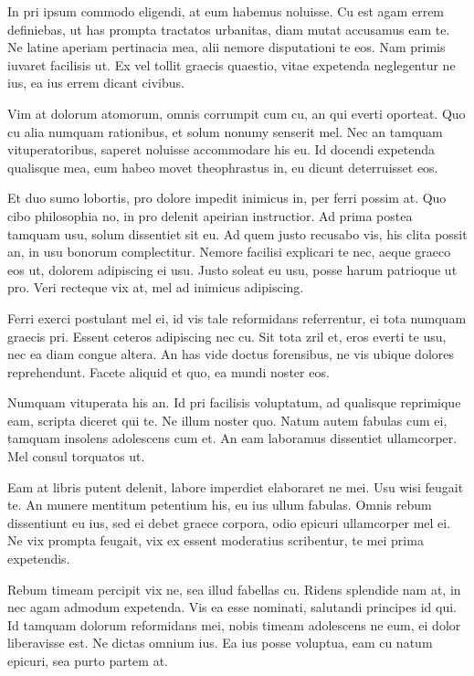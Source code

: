 \documentclass[twocolumn,twoside]{IEEEtran}
\begin{document}
 In pri ipsum commodo eligendi, at eum habemus noluisse. Cu est agam errem
 definiebas, ut has prompta tractatos urbanitas, diam mutat accusamus eam te.
 Ne latine aperiam pertinacia mea, alii nemore disputationi te eos. Nam primis
 iuvaret facilisis ut. Ex vel tollit graecis quaestio, vitae expetenda
 neglegentur ne ius, ea ius errem dicant civibus.

 Vim at dolorum atomorum, omnis corrumpit cum cu, an qui everti oporteat. Quo
 cu alia numquam rationibus, et solum nonumy senserit mel. Nec an tamquam
 vituperatoribus, saperet noluisse accommodare his eu. Id docendi expetenda
 qualisque mea, eum habeo movet theophrastus in, eu dicunt deterruisset eos.

 Et duo sumo lobortis, pro dolore impedit inimicus in, per ferri possim at. Quo
 cibo philosophia no, in pro delenit apeirian instructior. Ad prima postea
 tamquam usu, solum dissentiet sit eu. Ad quem justo recusabo vis, his clita
 possit an, in usu bonorum complectitur. Nemore facilisi explicari te nec,
 aeque graeco eos ut, dolorem adipiscing ei usu. Justo soleat eu usu, posse
 harum patrioque ut pro. Veri recteque vix at, mel ad inimicus adipiscing.

 Ferri exerci postulant mel ei, id vis tale reformidans referrentur, ei tota
 numquam graecis pri. Essent ceteros adipiscing nec cu. Sit tota zril et, eros
 everti te usu, nec ea diam congue altera. An has vide doctus forensibus, ne
 vis ubique dolores reprehendunt. Facete aliquid et quo, ea mundi noster eos.

 Numquam vituperata his an. Id pri facilisis voluptatum, ad qualisque
 reprimique eam, scripta diceret qui te. Ne illum noster quo. Natum autem
 fabulas cum ei, tamquam insolens adolescens cum et. An eam laboramus
 dissentiet ullamcorper. Mel consul torquatos ut.

 Eam at libris putent delenit, labore imperdiet elaboraret ne mei. Usu wisi
 feugait te. An munere mentitum petentium his, eu ius ullum fabulas. Omnis
 rebum dissentiunt eu ius, sed ei debet graece corpora, odio epicuri
 ullamcorper mel ei. Ne vix prompta feugait, vix ex essent moderatius
 scribentur, te mei prima expetendis.

 Rebum timeam percipit vix ne, sea illud fabellas cu. Ridens splendide nam at,
 in nec agam admodum expetenda. Vis ea esse nominati, salutandi principes id
 qui. Id tamquam dolorum reformidans mei, nobis timeam adolescens ne eum, ei
 dolor liberavisse est. Ne dictas omnium ius. Ea ius posse voluptua, eam cu
 natum epicuri, sea purto partem at.
\end{document}
